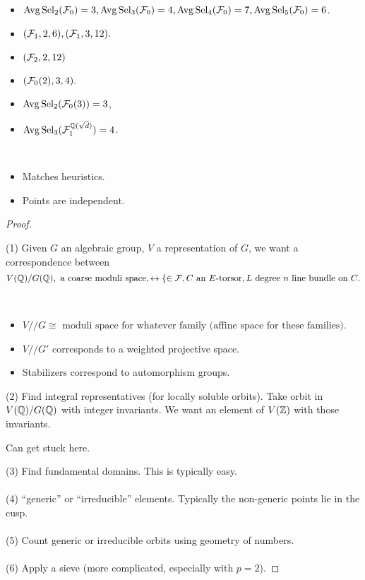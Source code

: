 \documentclass[12pt,amsfont]{amsart}
\begin{document}
\begin{itemize}
\item
$\operatorname{Avg} \operatorname{Sel}_2 (\mathcal{F}_0) =  3, \operatorname{Avg} \operatorname{Sel}_3 (\mathcal{F}_0) = 4, \operatorname{Avg} \operatorname{Sel}_4 (\mathcal{F}_0) = 7, \operatorname{Avg} \operatorname{Sel}_5 (\mathcal{F}_0) = 6$. 
\item
$(\mathcal{F}_1, 2, 6), (\mathcal{F}_1, 3, 12).$ 
\item
$(\mathcal{F}_2, 2, 12)$ 
\item
$(\mathcal{F}_0(2), 3, 4).$
\item
$\operatorname{Avg} \operatorname{Sel}_2 (\mathcal{F}_0(3)) = 3$, 
\item
$\operatorname{Avg} \operatorname{Sel}_3(\mathcal{F}_1^{{\mathbb Q}(\sqrt{d})}) = 4$. 
\end{itemize}
\begin{rmk} 
{\ }
\begin{itemize}
\item
Matches heuristics. 
\item
Points are independent.
\end{itemize}
\end{rmk}

\begin{proof} 
{\ }

(1) Given $G$ an algebraic group, $V$ a representation of $G$, we want a correspondence between
\[
V({\mathbb Q})/G({\mathbb Q}),\text{ a coarse moduli space}, \leftrightarrow  \{
\in \mathcal{F}, C \text{ an } E\text{-torsor}, L \text{ degree } n \text{ line bundle on } C.
\]
\begin{rmk} 
{\ }
\begin{itemize}
\item
$V//G \cong \text{ moduli space for whatever family (affine space for these families)}$. 
\item
$V//G'$ corresponds to a weighted projective space.
\item
Stabilizers correspond to automorphism groups.
\end{itemize}
\end{rmk}

(2) Find integral representatives (for locally soluble orbits). Take orbit in $V({\mathbb Q})/G({\mathbb Q})$ with integer invariants. We want an element of $V({\mathbb Z})$ with those invariants. 
\begin{rmk} Can get stuck here.
\end{rmk}

(3) Find fundamental domains. This is typically easy. \\ \\
(4) ``generic'' or ``irreducible'' elements. Typically the non-generic points lie in the cusp. \\ \\
(5) Count generic or irreducible orbits using geometry of numbers. \\ \\
(6) Apply a sieve (more complicated, especially with $p=2$). \end{proof}
\end{document}
